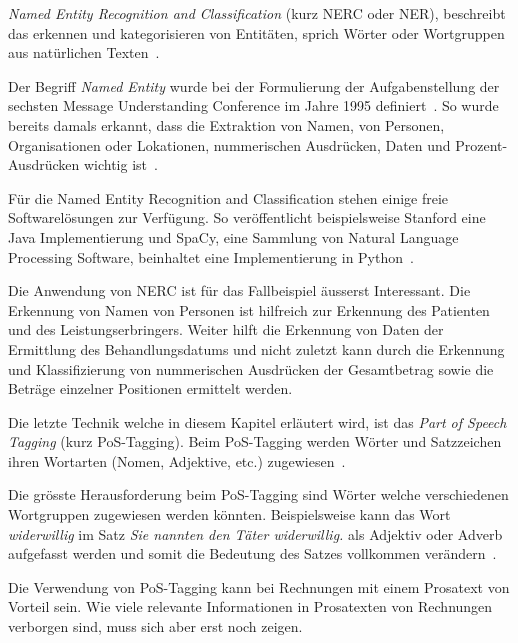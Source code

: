 \textit{Named Entity Recognition and Classification} (kurz NERC oder NER), beschreibt das erkennen und kategorisieren von Entitäten, sprich Wörter oder Wortgruppen aus natürlichen Texten~\autocite{Nadeau2007}.

Der Begriff \textit{Named Entity} wurde bei der Formulierung der Aufgabenstellung der sechsten Message Understanding Conference im Jahre 1995 definiert~\autocite{Borthwick1998}. So wurde bereits damals erkannt, dass die Extraktion von Namen, von Personen, Organisationen oder Lokationen, nummerischen Ausdrücken, Daten und Prozent-Ausdrücken wichtig ist~\autocite{Nadeau2007}.

Für die Named Entity Recognition and Classification stehen einige freie Softwarelösungen zur Verfügung. So veröffentlicht beispielsweise Stanford eine Java Implementierung und SpaCy, eine Sammlung von Natural Language Processing Software, beinhaltet eine Implementierung in Python~\autocite{StanfordNLPGroup, ExplosionAI}.

Die Anwendung von NERC ist für das Fallbeispiel äusserst Interessant. Die Erkennung von Namen von Personen ist hilfreich zur Erkennung des Patienten und des Leistungserbringers. Weiter hilft die Erkennung von Daten der Ermittlung des Behandlungsdatums und nicht zuletzt kann durch die Erkennung und Klassifizierung von nummerischen Ausdrücken der Gesamtbetrag sowie die Beträge einzelner Positionen ermittelt werden.

Die letzte Technik welche in diesem Kapitel erläutert wird, ist das \textit{Part of Speech Tagging} (kurz PoS-Tagging). Beim PoS-Tagging werden Wörter und Satzzeichen ihren Wortarten (Nomen, Adjektive, etc.) zugewiesen~\autocite{Xiao2004}.

Die grösste Herausforderung beim PoS-Tagging sind Wörter welche verschiedenen Wortgruppen zugewiesen werden könnten. Beispielsweise kann das Wort \textit{widerwillig} im Satz \textit{Sie nannten den Täter widerwillig.} als Adjektiv oder Adverb aufgefasst werden und somit die Bedeutung des Satzes vollkommen verändern~\autocite{Volk}.


Die Verwendung von PoS-Tagging kann bei Rechnungen mit einem Prosatext von Vorteil sein. Wie viele relevante Informationen in Prosatexten von Rechnungen verborgen sind, muss sich aber erst noch zeigen.

